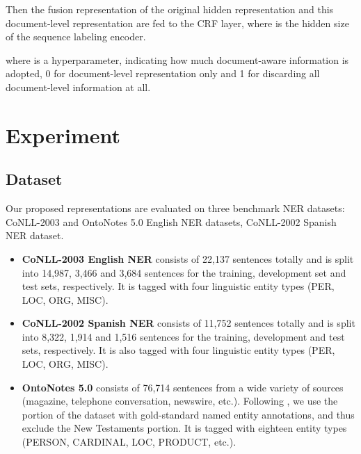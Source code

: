 \documentclass[letterpaper]{article} \usepackage{aaai20}  \usepackage{times}  \usepackage{helvet} \usepackage{courier}  \usepackage[hyphens]{url}  \usepackage{graphicx} \urlstyle{rm} \def\UrlFont{\rm}  \usepackage{graphicx}  \frenchspacing  \setlength{\pdfpagewidth}{8.5in}  \setlength{\pdfpageheight}{11in}
\begin{document}
Then the fusion representation  of the original hidden representation and this document-level representation are fed to the CRF layer, where  is the hidden size of the sequence labeling encoder.

where  is a hyperparameter, indicating how much document-aware information is adopted, 0 for document-level representation only and 1 for discarding all document-level information at all.

\section{Experiment}

\subsection{Dataset}
Our proposed representations are evaluated on three benchmark NER datasets: CoNLL-2003 \cite{sang2003introduction} and OntoNotes 5.0  \cite{pradhan2013towards} English NER datasets, CoNLL-2002 Spanish NER \cite{Erik2002introduction} dataset. 

\begin{itemize}
    \item \textbf{CoNLL-2003 English NER} consists of 22,137 sentences
    totally and is split into 14,987, 3,466 and 3,684 sentences
    for the training, development set and test sets, respectively. It is tagged with four linguistic
    entity types (PER, LOC, ORG, MISC).
    \item  \textbf{CoNLL-2002 Spanish NER} consists of 11,752 sentences totally and is split into 8,322, 1,914 and 1,516 sentences
    for the training, development and test sets, respectively. It is also tagged with four linguistic
    entity types (PER, LOC, ORG, MISC).
    \item \textbf{OntoNotes 5.0} consists of 76,714 sentences
    from a wide variety of sources (magazine, telephone conversation,
    newswire, etc.). Following \cite{chiu2016named,chen2019grn}, we use the portion of the dataset with gold-standard named
    entity annotations, and thus exclude the New Testaments
    portion. It is tagged with eighteen entity types (PERSON, CARDINAL, LOC, PRODUCT, etc.).
\end{itemize}
\end{document}
